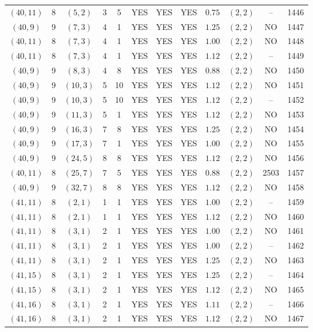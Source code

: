 \begin{longtable}{|c|c|c|c|c|c|c|c|c|c|c|c|}
$(40,11)$ & 8 & $(5,2)$ & 3 & 5 & YES & YES & YES & $0.75$ & $(2,2)$ & -- & 1446\\
$(40,9)$ & 9 & $(7,3)$ & 4 & 1 & YES & YES & YES & $1.25$ & $(2,2)$ & NO & 1447\\
$(40,11)$ & 8 & $(7,3)$ & 4 & 1 & YES & YES & YES & $1.00$ & $(2,2)$ & NO & 1448\\
$(40,11)$ & 8 & $(7,3)$ & 4 & 1 & YES & YES & YES & $1.12$ & $(2,2)$ & -- & 1449\\
$(40,9)$ & 9 & $(8,3)$ & 4 & 8 & YES & YES & YES & $0.88$ & $(2,2)$ & NO & 1450\\
$(40,9)$ & 9 & $(10,3)$ & 5 & 10 & YES & YES & YES & $1.12$ & $(2,2)$ & NO & 1451\\
$(40,9)$ & 9 & $(10,3)$ & 5 & 10 & YES & YES & YES & $1.12$ & $(2,2)$ & -- & 1452\\
$(40,9)$ & 9 & $(11,3)$ & 5 & 1 & YES & YES & YES & $1.12$ & $(2,2)$ & NO & 1453\\
$(40,9)$ & 9 & $(16,3)$ & 7 & 8 & YES & YES & YES & $1.25$ & $(2,2)$ & NO & 1454\\
$(40,9)$ & 9 & $(17,3)$ & 7 & 1 & YES & YES & YES & $1.00$ & $(2,2)$ & NO & 1455\\
$(40,9)$ & 9 & $(24,5)$ & 8 & 8 & YES & YES & YES & $1.12$ & $(2,2)$ & NO & 1456\\
$(40,11)$ & 8 & $(25,7)$ & 7 & 5 & YES & YES & YES & $0.88$ & $(2,2)$ & 2503 & 1457\\
$(40,9)$ & 9 & $(32,7)$ & 8 & 8 & YES & YES & YES & $1.12$ & $(2,2)$ & NO & 1458\\
$(41,11)$ & 8 & $(2,1)$ & 1 & 1 & YES & YES & YES & $1.00$ & $(2,2)$ & -- & 1459\\
$(41,11)$ & 8 & $(2,1)$ & 1 & 1 & YES & YES & YES & $1.12$ & $(2,2)$ & NO & 1460\\
$(41,11)$ & 8 & $(3,1)$ & 2 & 1 & YES & YES & YES & $1.00$ & $(2,2)$ & NO & 1461\\
$(41,11)$ & 8 & $(3,1)$ & 2 & 1 & YES & YES & YES & $1.00$ & $(2,2)$ & -- & 1462\\
$(41,11)$ & 8 & $(3,1)$ & 2 & 1 & YES & YES & YES & $1.25$ & $(2,2)$ & NO & 1463\\
$(41,15)$ & 8 & $(3,1)$ & 2 & 1 & YES & YES & YES & $1.25$ & $(2,2)$ & -- & 1464\\
$(41,15)$ & 8 & $(3,1)$ & 2 & 1 & YES & YES & YES & $1.12$ & $(2,2)$ & NO & 1465\\
$(41,16)$ & 8 & $(3,1)$ & 2 & 1 & YES & YES & YES & $1.11$ & $(2,2)$ & -- & 1466\\
$(41,16)$ & 8 & $(3,1)$ & 2 & 1 & YES & YES & YES & $1.12$ & $(2,2)$ & NO & 1467\\

\end{longtable}
